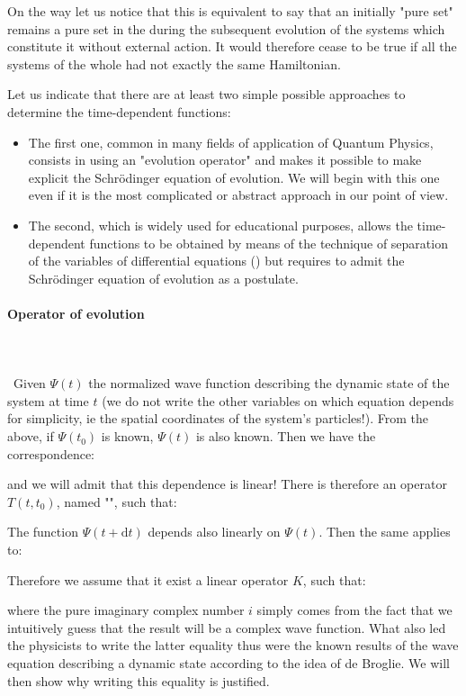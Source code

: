 	On the way let us notice that this is equivalent to say that an initially "pure set" remains a pure set in the during the subsequent evolution of the systems which constitute it without external action. It would therefore cease to be true if all the systems of the whole had not exactly the same Hamiltonian.
	
	Let us indicate that there are at least two simple possible approaches to determine the time-dependent functions:
	\begin{itemize}
		\item The first one, common in many fields of application of Quantum Physics, consists in using an "evolution operator" and makes it possible to make explicit the Schrödinger equation of evolution. We will begin with this one even if it is the most complicated or abstract approach in our point of view.

		\item The second, which is widely used for educational purposes, allows the time-dependent functions to be obtained by means of the technique of separation of the variables of differential equations () but requires to admit the Schrödinger equation of evolution as a postulate.
	\end{itemize}
	
	\paragraph{Operator of evolution}\mbox{}\\\\\
	Given $\Psi(t)$ the normalized wave function describing the dynamic state of the system at time $t$ (we do not write the other variables on which equation depends for simplicity, ie the spatial coordinates of the system's particles!). From the above, if $\Psi(t_0)$ is known, $\Psi(t)$ is also known. Then we have the correspondence:
	
	and we will admit that this dependence is linear! There is therefore an operator $T(t,t_0)$, named "", such that:
	
	The function $\Psi(t+\mathrm{d}t)$ depends also linearly on $\Psi(t)$. Then the same applies to:
	
	Therefore we assume that it exist a linear operator $K$, such that:
	
	where the pure imaginary complex number $i$ simply comes from the fact that we intuitively guess that the result will be a complex wave function. What also led the physicists to write the latter equality thus were the known results of the wave equation describing a dynamic state according to the idea of de Broglie. We will then show why writing this equality is justified.
	
